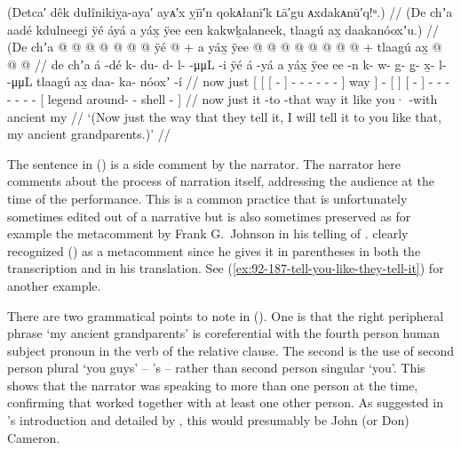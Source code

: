 \ex\label{ex:92-107-tell-it-how-they-told-it}%
%
\begingl
	\glpreamble	(Detca′ dêk dułînikiỵa-aya′ ayᴀ′x ỵīī′n qokᴀłanī′k ʟā′gu ᴀxdakᴀnū′q!ᵘ.) //
	\glpreamble	(De chʼa aadé kdulneegi ÿé áyá a yáx̱ ÿee een kakwḵalaneek, tlaagú ax̱ daakanóoxʼu.) //
	\gla	(De chʼa 
		{} {} {}  @ {} {}
			 @ {} @ {} @ {} @ {} @ {} @ {} {} ÿé {}
		 @ {} +
		{} a yáx̱ {}
		{} ÿee  @ {} {}
		 @ {} @ {} @ {} @ {} @ {} @ {} @ {} +
		{} tlaagú ax̱  @ {} @ {} @ {} {} //
	\glb	\phantom{(}de chʼa
		{} {} {} á -dé {} k- du- d- l-  -μμL -i {} ÿé {}
		á -yá
		{} a yáx̱ {}
		{} ÿee ee -n {}
		k- w- g- g̱- x̱- l-  -μμL
		{} tlaagú ax̱ daa- ka- nóoxʼ -í {}\rlap{\phantom{)}} //
	\glc	\phantom{(}now just
		{}[ {}[ {}[  - {}]
			- - - - 
				 - - {}] way {}]
		 -
		{}[   {}]
		{}[   - {}]
		- - - - - -
			 -
		{}[ legend  around- - shell - 
		{}]\rlap{\phantom{)}} //
	\gld	\phantom{(}now just {} {} {} it -to {}
			 {} {} {} {} {} -that {}
			way {}
		 {}
		{} it like {}
		{} you· {} -with {}
		 {} {} {} {} {} {} {}
		{} ancient my  {} {} {} {} //
	\glft	‘(Now just the way that they tell it, I will tell it to you like that, my ancient grandparents.)’
		//
\endgl
\xe

The sentence in (\lastx) is a side comment by the narrator.
The narrator here comments about the process of narration itself, addressing the audience at the time of the performance.
This is a common practice that is unfortunately sometimes edited out of a narrative but is also sometimes preserved as for example the metacomment by  Frank G.\ Johnson in his telling of  \parencite[140.24]{dauenhauer:1987}.
\citeauthor{swanton:1909} clearly recognized (\lastx) as a metacomment since he gives it in parentheses in both the transcription and in his translation.
See (\ref{ex:92-187-tell-you-like-they-tell-it}) for another example.

There are two grammatical points to note in (\lastx).
One is that the right peripheral phrase  ‘my ancient grandparents’ is coreferential with the fourth person human subject pronoun  in the verb  of the relative clause.
The second is the use of second person plural  ‘you guys’ – \citeauthor{swanton:1909}’s  – rather than second person singular  ‘you’.
This shows that the narrator was speaking to more than one person at the time, confirming that \citeauthor{swanton:1909} worked together with at least one other person.
As suggested in \citeauthor{swanton:1909}’s introduction and detailed by \textcite{jones:2017}, this would presumably be  John (or Don) Cameron.

